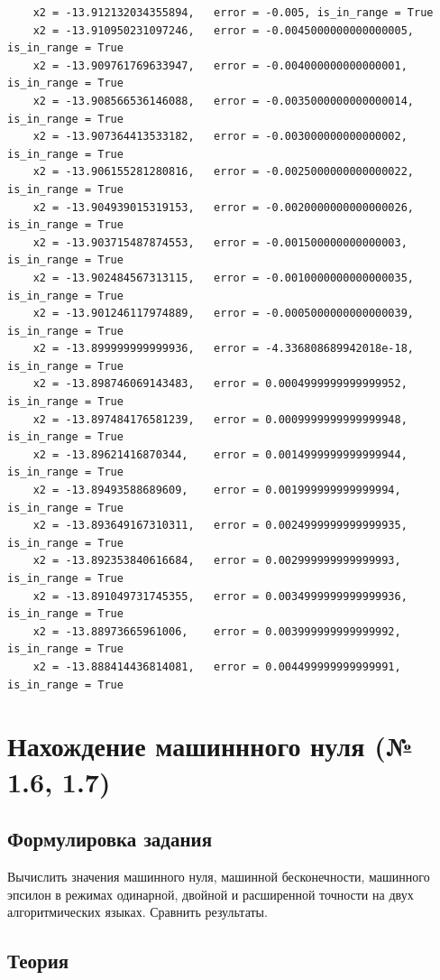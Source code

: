 \documentclass[a4paper,11pt]{article}
\theoremstyle{definition} %
\theoremstyle{remark} %
\begin{document}
\begin{verbatim}
    x2 = -13.912132034355894,	error = -0.005,	is_in_range = True
    x2 = -13.910950231097246,	error = -0.0045000000000000005,	is_in_range = True
    x2 = -13.909761769633947,	error = -0.004000000000000001,	is_in_range = True
    x2 = -13.908566536146088,	error = -0.0035000000000000014,	is_in_range = True
    x2 = -13.907364413533182,	error = -0.003000000000000002,	is_in_range = True
    x2 = -13.906155281280816,	error = -0.0025000000000000022,	is_in_range = True
    x2 = -13.904939015319153,	error = -0.0020000000000000026,	is_in_range = True
    x2 = -13.903715487874553,	error = -0.001500000000000003,	is_in_range = True
    x2 = -13.902484567313115,	error = -0.0010000000000000035,	is_in_range = True
    x2 = -13.901246117974889,	error = -0.0005000000000000039,	is_in_range = True
    x2 = -13.899999999999936,	error = -4.336808689942018e-18,	is_in_range = True
    x2 = -13.898746069143483,	error = 0.0004999999999999952,	is_in_range = True
    x2 = -13.897484176581239,	error = 0.0009999999999999948,	is_in_range = True
    x2 = -13.89621416870344,	error = 0.0014999999999999944,	is_in_range = True
    x2 = -13.89493588689609,	error = 0.001999999999999994,	is_in_range = True
    x2 = -13.893649167310311,	error = 0.0024999999999999935,	is_in_range = True
    x2 = -13.892353840616684,	error = 0.002999999999999993,	is_in_range = True
    x2 = -13.891049731745355,	error = 0.0034999999999999936,	is_in_range = True
    x2 = -13.88973665961006,	error = 0.003999999999999992,	is_in_range = True
    x2 = -13.888414436814081,	error = 0.004499999999999991,	is_in_range = True
\end{verbatim}


\newpage
\section{Нахождение машиннного нуля (№ 1.6, 1.7)}

\subsection{Формулировка задания}

Вычислить значения машинного нуля, машинной бесконечности, машинного эпсилон в режимах одинарной, двойной и расширенной точности на двух алгоритмических языках. Сравнить результаты.

\subsection{Теория}
\end{document}
